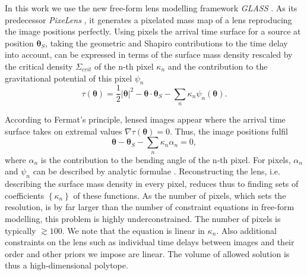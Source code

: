 \documentclass[useAMS,usenatbib]{mn2e}
\begin{document}
In this work we use the new free-form lens modelling framework \textit{GLASS} \citep{2012MNRAS.425.3077L}. As its predecessor \textit{PixeLens} \citep{2004AJ....127.2604S}, it generates a pixelated mass map of a lens reproducing the image positions perfectly. Using pixels the arrival time surface for a source at position $\boldsymbol\theta_{S}$, taking the geometric and Shapiro contributions to the time delay into account, can be expressed in terms of the surface mass density rescaled by the critical density $\Sigma_{crit}$ of the n-th pixel $\kappa_{n}$ and the contribution to the gravitational potential of this pixel $\psi_{n}$ \citep{1997MNRAS.292..148S}
\begin{equation}\label{eq:arrival}
\tau(\boldsymbol\theta)=\frac{1}{2}|\boldsymbol\theta |^{2}-\boldsymbol\theta\cdot\boldsymbol\theta_{S}-\displaystyle\sum\limits_{n} \kappa_{n}\psi_{n}(\boldsymbol\theta).
\end{equation}

According to Fermat's principle, lensed images appear where the arrival time surface takes on extremal values $\nabla\tau(\boldsymbol\theta)=0$. Thus, the image positions fulfil
\begin{equation}
\boldsymbol\theta-\boldsymbol\theta_{S}-\displaystyle\sum\limits_{n} \kappa_{n}\alpha_{n}=0,
\end{equation}
where $\alpha_{n}$ is the contribution to the bending angle of the n-th pixel. For pixels, $\alpha_{n}$ and $\psi_{n}$ can be described by analytic formulae \citep{1997MNRAS.292..148S}. Reconstructing the lens, i.e. describing the surface mass density in every pixel, reduces thus to finding sets of coefficients $\left\{\kappa_{n}\right\}$ of these functions. As the number of pixels, which sets the resolution, is by far larger than the number of constraint equations in free-form modelling, this problem is highly underconstrained. The number of pixels is typically $\gtrsim 100$. We note that the equation is linear in $\kappa_{n}$. Also additional constraints on the lens such as individual time delays between images and their order and other priors we impose are linear. The volume of allowed solution is thus a high-dimensional polytope.
\end{document}
